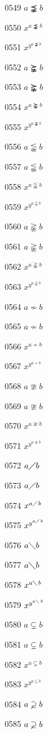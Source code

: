 \documentclass{article}
\begin{document}
0549 $\displaystyle a\precnapprox b$\par
0550 $x^{a\precnapprox b}$\par
0551 $x^{y^{a\precnapprox b}}$\par
0552 $a\succnapprox b$\par
0553 $\displaystyle a\succnapprox b$\par
0554 $x^{a\succnapprox b}$\par
0555 $x^{y^{a\succnapprox b}}$\par
0556 $a\lnapprox b$\par
0557 $\displaystyle a\lnapprox b$\par
0558 $x^{a\lnapprox b}$\par
0559 $x^{y^{a\lnapprox b}}$\par
0560 $a\gnapprox b$\par
0561 $\displaystyle a\gnapprox b$\par
0562 $x^{a\gnapprox b}$\par
0563 $x^{y^{a\gnapprox b}}$\par
0564 $a\nsim b$\par
0565 $\displaystyle a\nsim b$\par
0566 $x^{a\nsim b}$\par
0567 $x^{y^{a\nsim b}}$\par
0568 $a\ncong b$\par
0569 $\displaystyle a\ncong b$\par
0570 $x^{a\ncong b}$\par
0571 $x^{y^{a\ncong b}}$\par
0572 $a\diagup b$\par
0573 $\displaystyle a\diagup b$\par
0574 $x^{a\diagup b}$\par
0575 $x^{y^{a\diagup b}}$\par
0576 $a\diagdown b$\par
0577 $\displaystyle a\diagdown b$\par
0578 $x^{a\diagdown b}$\par
0579 $x^{y^{a\diagdown b}}$\par
0580 $a\varsubsetneq b$\par
0581 $\displaystyle a\varsubsetneq b$\par
0582 $x^{a\varsubsetneq b}$\par
0583 $x^{y^{a\varsubsetneq b}}$\par
0584 $a\varsupsetneq b$\par
0585 $\displaystyle a\varsupsetneq b$\par
\end{document}
